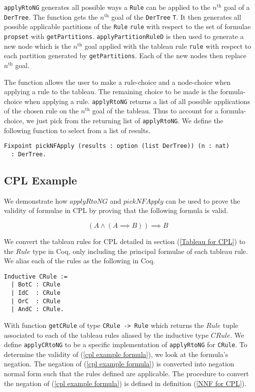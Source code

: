 \documentclass{llncs}
\begin{document}
\verb+applyRtoNG+ generates all possible ways a \verb+Rule+ can be applied to
the $n^{\textrm{th}}$ goal of a \verb+DerTree+. The function gets the
$n^{\textrm{th}}$ goal of the \verb+DerTree+ \verb+T+. It then generates all
possible applicable partitions of the \verb+Rule+ \verb+rule+ with respect to
the set of formulae \verb+propset+ with \verb+getPartitions+.
\verb+applyPartitionRuleD+ is then used to generate a new node which is the
$n^{\textrm{th}}$ goal applied with the  tableau rule \verb+rule+ with respect
to each partition generated by \verb+getPartitions+. Each of the new nodes
then replace $n^{\textrm{th}}$ goal.

The function allows the user to make a rule-choice and a node-choice when
applying a rule to the tableau. The remaining choice to be made is the
formula-choice when applying a rule. \verb+applyRtoNG+ returns a list of all
possible applications of the chosen rule on the $n^{\textrm{th}}$ goal of the
tableau. Thus to account for a formula-choice, we just pick from the returning
list of \verb+applyRtoNG+. We define the following function to select from a
list of results.

\begin{verbatim}
Fixpoint pickNFApply (results : option (list DerTree)) (n : nat)
  : DerTree.
\end{verbatim}

\subsection{CPL Example}

We demonstrate how $applyRtoNG$ and $pickNFApply$ can be used to prove the
validity of formulae in CPL by proving that the following formula is valid.

\begin{equation}
(A \wedge (A \implies B)) \implies B
\label{cpl example formula}
\end{equation}

We convert the tableau rules for CPL detailed in section (\ref{Tableau for
CPL}) to the $Rule$ type in Coq, only including the principal formulae of each
tableau rule. We alias each of the rules as the following in Coq.

\begin{verbatim}
Inductive CRule := 
  | BotC : CRule
  | IdC  : CRule
  | OrC  : CRule
  | AndC : CRule.
\end{verbatim}

With function \verb+getCRule+ of type \verb+CRule -> Rule+ which returns the
$Rule$ tuple associated to each of the tableau rules aliased by the inductive
type $CRule$. We define \verb+applyCRtoNG+ to be a specific implementation of
\verb+applyRtoNG+ for \verb+CRule+. To determine the validity of (\ref{cpl
example formula}), we look at the formula's negation. The negation of (\ref{cpl
example formula}) is converted into negation normal form such that the rules
defined are applicable.  The procedure to convert the negation of (\ref{cpl
example formula}) is defined in definition (\ref{NNF for CPL}).
\end{document}

